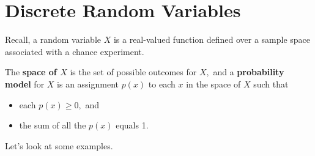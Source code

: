 \documentclass[
]{book}
\providecommand{\tightlist}{%
  \setlength{\itemsep}{0pt}\setlength{\parskip}{0pt}}
\theoremstyle{definition}
\theoremstyle{definition}
\theoremstyle{definition}
\theoremstyle{definition}
\theoremstyle{remark}
\begin{document}
\chapter{Discrete Random Variables}\label{discrete-random-variables}

Recall, a random variable \(X\) is a real-valued function defined over a sample space associated with a chance experiment.

The \textbf{space of \(X\)} is the set of possible outcomes for \(X,\) and a \textbf{probability model} for \(X\) is an assignment \(p(x)\) to each \(x\) in the space of \(X\) such that

\begin{itemize}
\tightlist
\item
  each \(p(x) \geq 0,\) and
\item
  the sum of all the \(p(x)\) equals 1.
\end{itemize}

Let's look at some examples.
\end{document}
